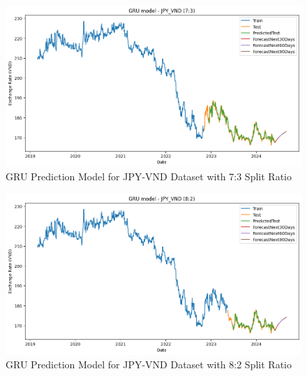 \documentclass{ieeeojies}
\begin{document}
\begin{figure}[H]
  \centering
  \begin{minipage}{0.8\linewidth}
    \centering
    \includegraphics[width=\linewidth]{GRU/GRU_jpy_73.png}
    \caption{GRU Prediction Model for JPY-VND Dataset with 7:3 Split Ratio}
    \label{fig32}
  \end{minipage}
\end{figure}
\begin{figure}[H]
  \centering
  \begin{minipage}{0.8\linewidth}
    \centering
    \includegraphics[width=\linewidth]{GRU/GRU_jpy_82.png}
    \caption{GRU Prediction Model for JPY-VND Dataset with 8:2 Split Ratio}
    \label{fig33}
  \end{minipage}
\end{figure}
\end{document}
